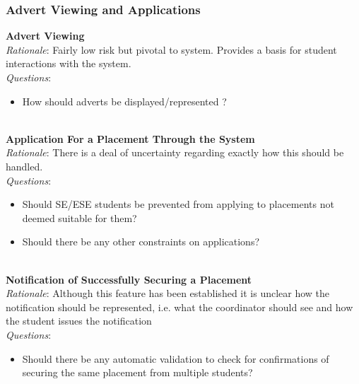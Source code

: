 \documentclass{l3deliverable}
\begin{document}
\subsubsection{Advert Viewing and Applications}
\textbf{Advert Viewing}\\
\emph{Rationale}: Fairly low risk but pivotal to system. Provides a basis for student interactions with the system.\\
\emph{Questions}:
\begin{itemize}
\item{How should adverts be displayed/represented ?}
\end{itemize}
\\
\textbf{Application For a Placement Through the System}\\
\emph{Rationale}: There is a deal of uncertainty regarding exactly how this should be handled.\\
\emph{Questions}:
\begin{itemize}
\item{Should SE/ESE students be prevented from applying to placements not deemed suitable for them?}
\item{Should there be any other constraints on applications?}
\end{itemize}
\\
\textbf{Notification of Successfully Securing a Placement}\\
\emph{Rationale}: Although this feature has been established it is unclear how the notification should be represented, i.e. what
the coordinator should see and how the student issues the notification\\
\emph{Questions}:
\begin{itemize}
\item{Should there be any automatic validation to check for confirmations of securing the same placement from multiple students?}
\end{itemize}
\\
\end{document}
